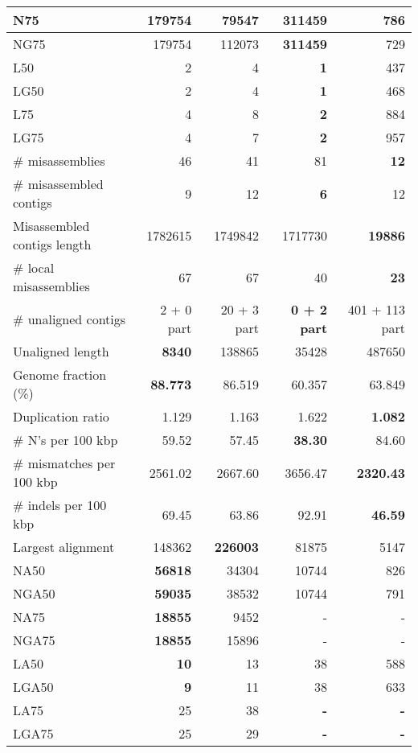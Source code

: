 \documentclass[12pt,a4paper]{article}
\begin{document}
\begin{table}[ht]
\begin{center}
\begin{tabular}{|l*{4}{|r}|}
N75 & 179754 & 79547 & {\bf 311459} & 786 \\ \hline
NG75 & 179754 & 112073 & {\bf 311459} & 729 \\ \hline
L50 & 2 & 4 & {\bf 1} & 437 \\ \hline
LG50 & 2 & 4 & {\bf 1} & 468 \\ \hline
L75 & 4 & 8 & {\bf 2} & 884 \\ \hline
LG75 & 4 & 7 & {\bf 2} & 957 \\ \hline
\# misassemblies & 46 & 41 & 81 & {\bf 12} \\ \hline
\# misassembled contigs & 9 & 12 & {\bf 6} & 12 \\ \hline
Misassembled contigs length & 1782615 & 1749842 & 1717730 & {\bf 19886} \\ \hline
\# local misassemblies & 67 & 67 & 40 & {\bf 23} \\ \hline
\# unaligned contigs & 2 + 0 part & 20 + 3 part & {\bf 0 + 2 part} & 401 + 113 part \\ \hline
Unaligned length & {\bf 8340} & 138865 & 35428 & 487650 \\ \hline
Genome fraction (\%) & {\bf 88.773} & 86.519 & 60.357 & 63.849 \\ \hline
Duplication ratio & 1.129 & 1.163 & 1.622 & {\bf 1.082} \\ \hline
\# N's per 100 kbp & 59.52 & 57.45 & {\bf 38.30} & 84.60 \\ \hline
\# mismatches per 100 kbp & 2561.02 & 2667.60 & 3656.47 & {\bf 2320.43} \\ \hline
\# indels per 100 kbp & 69.45 & 63.86 & 92.91 & {\bf 46.59} \\ \hline
Largest alignment & 148362 & {\bf 226003} & 81875 & 5147 \\ \hline
NA50 & {\bf 56818} & 34304 & 10744 & 826 \\ \hline
NGA50 & {\bf 59035} & 38532 & 10744 & 791 \\ \hline
NA75 & {\bf 18855} & 9452 & - & - \\ \hline
NGA75 & {\bf 18855} & 15896 & - & - \\ \hline
LA50 & {\bf 10} & 13 & 38 & 588 \\ \hline
LGA50 & {\bf 9} & 11 & 38 & 633 \\ \hline
LA75 & 25 & 38 & {\bf -} & {\bf -} \\ \hline
LGA75 & 25 & 29 & {\bf -} & {\bf -} \\ \hline
\end{tabular}
\end{center}
\end{table}
\end{document}
